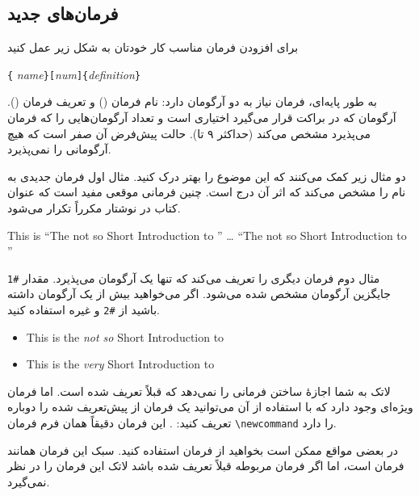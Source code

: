 \subsection{فرمان‌های جدید}

برای افزودن فرمان مناسب کار خودتان به شکل زیر عمل کنید

\begin{lscommand}
\verb|{|%
       \emph{name}\verb|}[|\emph{num}\verb|]{|\emph{definition}\verb|}|
\end{lscommand}

به طور پایه‌ای، فرمان نیاز به دو آرگومان دارد: نام فرمان () و تعریف فرمان  (). آرگومان   که در براکت قرار می‌گیرد اختیاری است و تعداد آرگومان‌هایی را که فرمان می‌پذیرد مشخص می‌کند 
(حداکثر ۹ تا).
حالت پیش‌فرض آن صفر است که هیچ آرگومانی را نمی‌پذیرد.

دو مثال زیر کمک می‌کنند که این موضوع را بهتر درک کنید. مثال اول فرمان جدیدی به نام   را مشخص می‌کند که اثر آن درج   است. چنین فرمانی موقعی مفید است که عنوان کتاب در نوشتار‌ مکرراً تکرار می‌شود.


\begin{example}
\newcommand{\tnss}{The not
    so Short Introduction to
    \LaTeXe}
This is ``\tnss'' \ldots{} 
``\tnss''
\end{example}


مثال دوم فرمان دیگری را تعریف می‌کند که تنها یک آرگومان می‌پذیرد. مقدار  \verb|#1| جایگزین آرگومان مشخص شده می‌شود. اگر می‌خواهید بیش از یک آرگومان داشته باشید از  \verb|#2| و  غیره استفاده کنید.


\begin{example}
\newcommand{\txsit}[1]
 {This is the \emph{#1} Short 
      Introduction to \LaTeXe}
\begin{itemize}
\item \txsit{not so}
\item \txsit{very}
\end{itemize}
\end{example}


لاتک به شما اجازهٔ ساختن فرمانی را نمی‌دهد که قبلاً تعریف شده است. اما فرمان ویژه‌ای وجود دارد که با استفاده از آن می‌توانید یک فرمان از پیش‌تعریف شده را دوباره تعریف کنید: .
این فرمان دقیقاً همان فرم فرمان \verb|\newcommand| را دارد.

در بعضی مواقع ممکن است بخواهید از فرمان  استفاده کنید. سبک این فرمان همانند فرمان  است، اما اگر فرمان مربوطه قبلاً تعریف شده باشد لاتک این فرمان را در نظر نمی‌گیرد.

